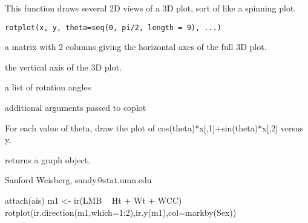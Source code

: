 \documentclass[letterpaper]{book}
\begin{document}
\begin{Description}\relax
This function draws several 2D views of a 3D plot, sort of like a spinning
plot.\end{Description}
\begin{Usage}
\begin{verbatim}
rotplot(x, y, theta=seq(0, pi/2, length = 9), ...)
\end{verbatim}
\end{Usage}
\begin{Arguments}
\begin{ldescription}
\item[\code{x}] a matrix with 2 columns giving the horizontal axes of the full 3D
plot.
\item[\code{y}] the vertical axis of the 3D plot.
\item[\code{theta}] a list of rotation angles
\item[\code{...}] additional arguments passed to coplot
\end{ldescription}
\end{Arguments}
\begin{Details}\relax
For each value of theta, draw the plot of cos(theta)*x[,1]+sin(theta)*x[,2]
versus y.\end{Details}
\begin{Value}
returns a graph object.\end{Value}
\begin{Author}\relax
Sanford Weisberg, sandy@stat.umn.edu\end{Author}
\begin{Examples}
\begin{ExampleCode}
 attach(ais)
 m1 <- ir(LMB ~ Ht + Wt + WCC)  
 rotplot(ir.direction(m1,which=1:2),ir.y(m1),col=markby(Sex))
  \end{ExampleCode}
\end{Examples}

\printindex
\end{document}
